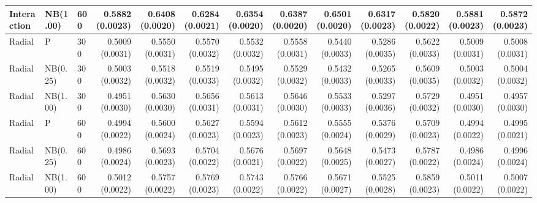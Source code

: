 \begin{table}[p]
{\begin{tabular}{lllrrrrrrrrrr}
Interaction & NB(1.00) & 600 & 0.5882 (0.0023) & 0.6408 (0.0020) & 0.6284 (0.0021) & 0.6354 (0.0020) & 0.6387 (0.0020) & 0.6501 (0.0020) & 0.6317 (0.0023) & 0.5820 (0.0022) & 0.5881 (0.0023) & 0.5872 (0.0023) \\
\hline
Radial & P & 300 & 0.5009 (0.0031) & 0.5550 (0.0031) & 0.5570 (0.0032) & 0.5532 (0.0032) & 0.5558 (0.0031) & 0.5440 (0.0033) & 0.5286 (0.0035) & 0.5622 (0.0033) & 0.5009 (0.0031) & 0.5008 (0.0031) \\
Radial & NB(0.25) & 300 & 0.5003 (0.0032) & 0.5518 (0.0032) & 0.5519 (0.0033) & 0.5495 (0.0032) & 0.5529 (0.0032) & 0.5432 (0.0033) & 0.5265 (0.0033) & 0.5609 (0.0035) & 0.5003 (0.0032) & 0.5004 (0.0032) \\
Radial & NB(1.00) & 300 & 0.4951 (0.0030) & 0.5630 (0.0030) & 0.5656 (0.0031) & 0.5613 (0.0031) & 0.5646 (0.0030) & 0.5533 (0.0033) & 0.5297 (0.0036) & 0.5729 (0.0032) & 0.4951 (0.0030) & 0.4957 (0.0030) \\
Radial & P & 600 & 0.4994 (0.0022) & 0.5600 (0.0024) & 0.5627 (0.0023) & 0.5594 (0.0023) & 0.5612 (0.0023) & 0.5555 (0.0024) & 0.5376 (0.0029) & 0.5709 (0.0023) & 0.4994 (0.0022) & 0.4995 (0.0021) \\
Radial & NB(0.25) & 600 & 0.4986 (0.0024) & 0.5693 (0.0023) & 0.5704 (0.0022) & 0.5676 (0.0021) & 0.5697 (0.0022) & 0.5648 (0.0025) & 0.5473 (0.0027) & 0.5787 (0.0022) & 0.4986 (0.0024) & 0.4996 (0.0024) \\
Radial & NB(1.00) & 600 & 0.5012 (0.0022) & 0.5757 (0.0022) & 0.5769 (0.0023) & 0.5743 (0.0022) & 0.5766 (0.0022) & 0.5671 (0.0027) & 0.5525 (0.0028) & 0.5859 (0.0023) & 0.5011 (0.0022) & 0.5007 (0.0022) \\
\hline
\end{tabular}%
}
\end{table}


